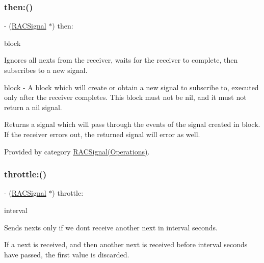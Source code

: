 \subsubsection{\texorpdfstring{then\+:()}{then:()}\hspace{0.1cm}{\footnotesize\ttfamily [3/3]}}
{\footnotesize\ttfamily -\/ (\mbox{\hyperlink{interface_r_a_c_signal}{R\+A\+C\+Signal}} $\ast$) then\+: \begin{DoxyParamCaption}\item[{(\mbox{\hyperlink{interface_r_a_c_signal}{R\+A\+C\+Signal}} $\ast$($^\wedge$)(void))}]{block }\end{DoxyParamCaption}}

Ignores all {\ttfamily next}s from the receiver, waits for the receiver to complete, then subscribes to a new signal.

block -\/ A block which will create or obtain a new signal to subscribe to, executed only after the receiver completes. This block must not be nil, and it must not return a nil signal.

Returns a signal which will pass through the events of the signal created in {\ttfamily block}. If the receiver errors out, the returned signal will error as well. 

Provided by category \mbox{\hyperlink{category_r_a_c_signal_07_operations_08_aeed35de5a36e70f87721a0ad6ffabecd}{R\+A\+C\+Signal(\+Operations)}}.

\mbox{\label{interface_r_a_c_signal_a2542ae804d05ec734d0f4d2fa8c3ac93}} 
\subsubsection{\texorpdfstring{throttle\+:()}{throttle:()}\hspace{0.1cm}{\footnotesize\ttfamily [1/3]}}
{\footnotesize\ttfamily -\/ (\mbox{\hyperlink{interface_r_a_c_signal}{R\+A\+C\+Signal}} $\ast$) throttle\+: \begin{DoxyParamCaption}\item[{(N\+S\+Time\+Interval)}]{interval }\end{DoxyParamCaption}}

Sends {\ttfamily next}s only if we don\textquotesingle{}t receive another {\ttfamily next} in {\ttfamily interval} seconds.

If a {\ttfamily next} is received, and then another {\ttfamily next} is received before {\ttfamily interval} seconds have passed, the first value is discarded.

